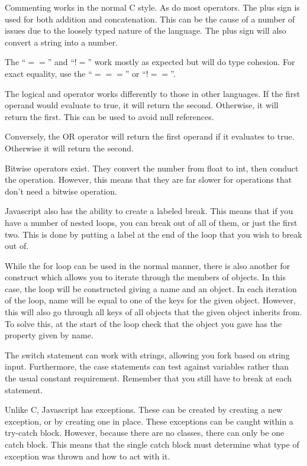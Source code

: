 			Commenting works in the normal C style. 
			As do most operators. 
			The plus sign is used for both addition and concatenation. 
			This can be the cause of a number of issues due to the loosely typed nature of the language. 
			The plus sign will also convert a string into a number. 

			The ``$==$'' and ``$!=$'' work mostly as expected but will do type cohesion. 
			For exact equality, use the ``$===$'' or ``$!==$''. 

			The logical and operator works differently to those in other languages. 
			If the first operand would evaluate to true, it will return the second.
			Otherwise, it will return the first. 
			This can be used to avoid null references. 

			Conversely, the OR operator will return the first operand if it evaluates to true. 
			Otherwise it will return the second. 

			Bitwise operators exist. 
			They convert the number from float to int, then conduct the operation. 
			However, this means that they are far slower for operations that don't need a bitwise operation. 

			Javascript also has the ability to create a labeled break. 
			This means that if you have a number of nested loops, you can break out of all of them, or just the first two. 
			This is done by putting a label at the end of the loop that you wish to break out of. 

			While the for loop can be used in the normal manner, 
			there is also another for construct which allows you to iterate through the members of objects. 
			In this case, the loop will be constructed giving a name and an object. 
			In each iteration of the loop, name will be equal to one of the keys for the given object. 
			However, this will also go through all keys of all objects that the given object inherits from. 
			To solve this, at the start of the loop check that the object you gave has the property given by name. 

			The switch statement can work with strings, allowing you fork based on string input. 
			Furthermore, the case statements can test against variables rather than the usual constant requirement. 
			Remember that you still have to break at each statement. 

			Unlike C, Javascript has exceptions. 
			These can be created by creating a new exception, or by creating one in place. 
			These exceptions can be caught within a try-catch block. 
			However, because there are no classes, there can only be one catch block. 
			This means that the single catch block must determine what type of exception was thrown and how to act with it. 

